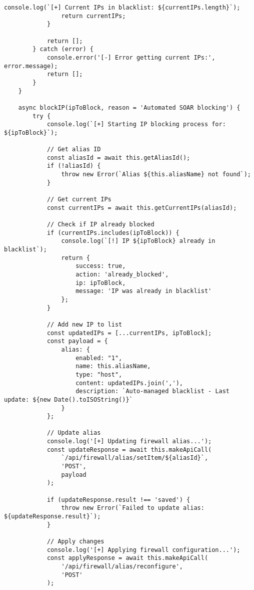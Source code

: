 \begin{lstlisting}[style=jsstyle,caption=Script n8n pour blocage automatique IP OPNsense]
                console.log(`[+] Current IPs in blacklist: ${currentIPs.length}`);
                return currentIPs;
            }
            
            return [];
        } catch (error) {
            console.error('[-] Error getting current IPs:', error.message);
            return [];
        }
    }

    async blockIP(ipToBlock, reason = 'Automated SOAR blocking') {
        try {
            console.log(`[+] Starting IP blocking process for: ${ipToBlock}`);
            
            // Get alias ID
            const aliasId = await this.getAliasId();
            if (!aliasId) {
                throw new Error(`Alias ${this.aliasName} not found`);
            }

            // Get current IPs
            const currentIPs = await this.getCurrentIPs(aliasId);
            
            // Check if IP already blocked
            if (currentIPs.includes(ipToBlock)) {
                console.log(`[!] IP ${ipToBlock} already in blacklist`);
                return {
                    success: true,
                    action: 'already_blocked',
                    ip: ipToBlock,
                    message: 'IP was already in blacklist'
                };
            }

            // Add new IP to list
            const updatedIPs = [...currentIPs, ipToBlock];
            const payload = {
                alias: {
                    enabled: "1",
                    name: this.aliasName,
                    type: "host",
                    content: updatedIPs.join(','),
                    description: `Auto-managed blacklist - Last update: ${new Date().toISOString()}`
                }
            };

            // Update alias
            console.log('[+] Updating firewall alias...');
            const updateResponse = await this.makeApiCall(
                `/api/firewall/alias/setItem/${aliasId}`, 
                'POST', 
                payload
            );

            if (updateResponse.result !== 'saved') {
                throw new Error(`Failed to update alias: ${updateResponse.result}`);
            }

            // Apply changes
            console.log('[+] Applying firewall configuration...');
            const applyResponse = await this.makeApiCall(
                '/api/firewall/alias/reconfigure', 
                'POST'
            );


\end{lstlisting}
